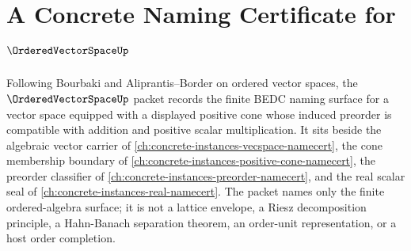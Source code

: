 \chapter{A Concrete Naming Certificate for $\OrderedVectorSpaceUp$}
\label{ch:concrete-instances-ordered-vector-space-namecert}

Following Bourbaki and Aliprantis--Border on ordered vector spaces, the $\OrderedVectorSpaceUp$ packet records the finite BEDC naming surface for a vector space equipped with a displayed positive cone whose induced preorder is compatible with addition and positive scalar multiplication. It sits beside the algebraic vector carrier of \autoref{ch:concrete-instances-vecspace-namecert}, the cone membership boundary of \autoref{ch:concrete-instances-positive-cone-namecert}, the preorder classifier of \autoref{ch:concrete-instances-preorder-namecert}, and the real scalar seal of \autoref{ch:concrete-instances-real-namecert}. The packet names only the finite ordered-algebra surface; it is not a lattice envelope, a Riesz decomposition principle, a Hahn-Banach separation theorem, an order-unit representation, or a host order completion.

